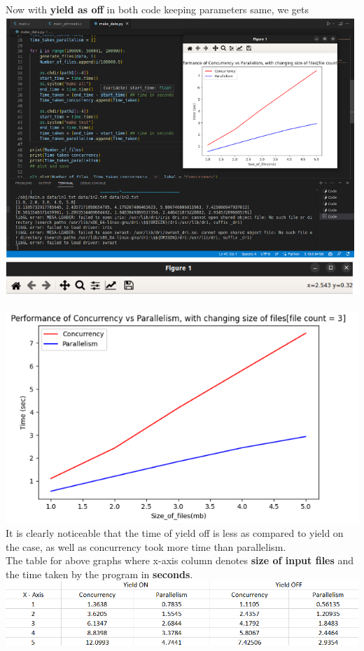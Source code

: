 \documentclass[12pt]{article}
\begin{document}
\begin{spacing}{1.2}
Now with \textbf{yield as off} in both code keeping parameters same, we gets\\
\includegraphics[width=16cm]{images/37.png}\\
\\
\includegraphics[width=16cm]{images/38.png}\\
It is clearly noticeable that the time of yield off is less as compared to yield on the case, as well as concurrency took more time than parallelism.\\
\newpage
The table for above graphs where x-axis column denotes \textbf{size of input files} and the time taken by the program in \textbf{seconds}. \\
\includegraphics[width=15cm]{images/image1.png}\\


\end{spacing}
\end{document}
